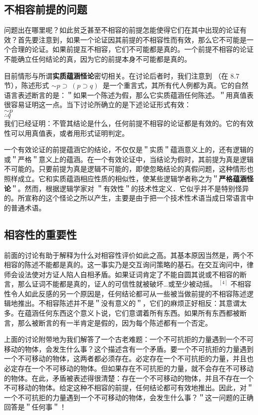 \subsection{不相容前提的问题}

问题出在哪里呢？如此贫乏甚至不相容的前提怎能使得它们在其中出现的论证有效？首先要注意到，如果一个论证因其前提的不相容性而有效，那么它不可能是一个合理的论证。如果前提互不相容，它们不可能都是真的。一个前提不相容的论证不能确立任何结论的真，因为它的前提本身不可能都是真的。

目前情形与所谓\textbf{实质蕴涵怪论}密切相关。在讨论后者时，我们注意到 （在 8.7 节），陈述形式 $\sim p \supset ~(p \supset q) ~$ 是一个重言式，其所有代人例都为真。它的自然语言表述断言的是：＂如果一个陈述为假，那么它实质蕴涵任何陈述。＂用真值表很容易证明这一点。当下讨论所确立的是下述论证形式有效：\\
$\sim p$\\
$\therefore q$\\
我们已经证明：不管其结论是什么，任何前提不相容的论证都是有效的。它的有效性可以用真值表，或者用形式证明判定。

一个有效论证的前提蕴涵它的结论，不仅仅是＂实质＂蕴涵意义上的，还有逻辑的或＂严格＂意义上的蕴涵。在一个有效论证中，当结论为假时，其前提为真是逻辑不可能的。只要前提为真是逻辑不可能的，即使忽略结论的真假问题，这种情形也照样成立。它和实质蕴涵相应性质的相似性，使某些逻辑学者称之为＂\textbf{严格蕴涵怪论}＂。然而，根据逻辑学家对 ＂有效性＂的技术性定义．它似乎并不是特别怪异的。所宣称的这个怪论之所以产生，主要是由于把一个技术性术语当成日常语言中的普通术语。

\subsection{相容性的重要性}

前面的讨论有助于解释为什么对相容性评价如此之高。其基本原因当然是，两个不相容的陈述不能都是真的。这一事实乃是交互询问策略的基石。在交互询问中，律师会设法使对方证人陷人自相矛盾。如果证词肯定了不能自圆其说或不相容的断言，那么证词不能都是真的，证人的可信性就被破坏…或至少被动摇。 ${ }^{[4]}$ 不相容性令人如此反感的另一个原因是，任何结论都可从一些被当做前提的不相容陈述逻辑地推出。不相容陈述并不是＂没有意义的＂，它们的麻烦正好相反：其意谓太多。在蕴涵任何东西这个意义卜说，它们意谓着所有东西。如果所有东西都被断言，那么被断言的有一半肯定是假的，因为每个陈述都有一个否定。

上面的讨论附带地为我们解答了一个古老难题：一个不可抗拒的力量遇到一个不可移动的物体，会发生什么事？这个描述含有一个矛盾。要一个不可抗拒的力量遇到一个不可移动的物体，这两者都必须存在。必定存在一个不可抗拒的力量，并且也必定存在一个不可移动的物体。但如果存在不可抗拒的力量，就不会存在不可移动的物体。在此，矛盾被表述得很清楚：存在一个不可移动的物体，并且不存在一个不可移动的物体。给定这种不相容的前提，任何结论都可有效地推出。因此，对＂一个不可抗拒的力量遇到一个不可移动的物体，会发生什么事？＂这一问题的正确回答是＂任何事＂！

